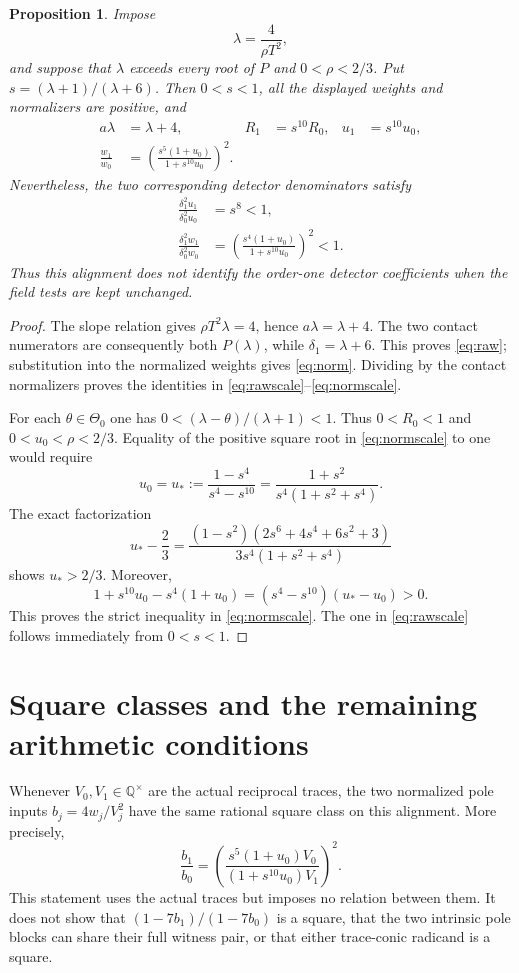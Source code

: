 \documentclass[10pt,a4paper]{article}
\newtheorem{proposition}{Proposition}
\newcommand{\Q}{\mathbb Q}
\begin{document}
\begin{proposition}\label{prop:alignment}
Impose
\[
                   \lambda=\frac4{\rho T^2},
\]
and suppose that $\lambda$ exceeds every root of $P$ and
$0<\rho<2/3$. Put $s=(\lambda+1)/(\lambda+6)$. Then $0<s<1$,
all the displayed weights and normalizers are positive, and
\begin{align}
 a\lambda&=\lambda+4,& R_1&=s^{10}R_0,& u_1&=s^{10}u_0,\label{eq:raw}\\
 \frac{w_1}{w_0}
 &=\left(\frac{s^5(1+u_0)}{1+s^{10}u_0}\right)^2.\label{eq:norm}
\end{align}
Nevertheless, the two corresponding detector denominators satisfy
\begin{align}
 \frac{\delta_1^2u_1}{\delta_0^2u_0}&=s^8<1,\label{eq:rawscale}\\
 \frac{\delta_1^2w_1}{\delta_0^2w_0}
 &=\left(\frac{s^4(1+u_0)}{1+s^{10}u_0}\right)^2<1.\label{eq:normscale}
\end{align}
Thus this alignment does not identify the order-one detector
coefficients when the field tests are kept unchanged.
\end{proposition}
\begin{proof}
The slope relation gives $\rho T^2\lambda=4$, hence
$a\lambda=\lambda+4$. The two contact numerators are consequently
both $P(\lambda)$, while $\delta_1=\lambda+6$.
This proves \eqref{eq:raw}; substitution into the normalized
weights gives \eqref{eq:norm}. Dividing by the contact normalizers
proves the identities in \eqref{eq:rawscale}--\eqref{eq:normscale}.

For each $\theta\in\Theta_0$ one has
$0<(\lambda-\theta)/(\lambda+1)<1$. Thus
$0<R_0<1$ and $0<u_0<\rho<2/3$. Equality of the positive square
root in \eqref{eq:normscale} to one would require
\[
 u_0=u_*:=\frac{1-s^4}{s^4-s^{10}}
          =\frac{1+s^2}{s^4(1+s^2+s^4)}.
\]
The exact factorization
\[
 u_*-\frac23
 =\frac{(1-s^2)(2s^6+4s^4+6s^2+3)}
        {3s^4(1+s^2+s^4)}
\]
shows $u_*>2/3$. Moreover,
\[
 1+s^{10}u_0-s^4(1+u_0)
                 =(s^4-s^{10})(u_*-u_0)>0.
\]
This proves the strict inequality in \eqref{eq:normscale}.
The one in \eqref{eq:rawscale} follows immediately from $0<s<1$.
\end{proof}

\section*{Square classes and the remaining arithmetic conditions}
Whenever $V_0,V_1\in\Q^\times$ are the actual reciprocal traces,
the two normalized pole inputs $b_j=4w_j/V_j^2$ have the same
rational square class on this alignment. More precisely,
\[
 \frac{b_1}{b_0}
 =\left(\frac{s^5(1+u_0)V_0}
                {(1+s^{10}u_0)V_1}\right)^2.
\]
This statement uses the actual traces but imposes no relation
between them. It does not show that $(1-7b_1)/(1-7b_0)$ is a
square, that the two intrinsic pole blocks can share their full
witness pair, or that either trace-conic radicand is a square.
\end{document}
